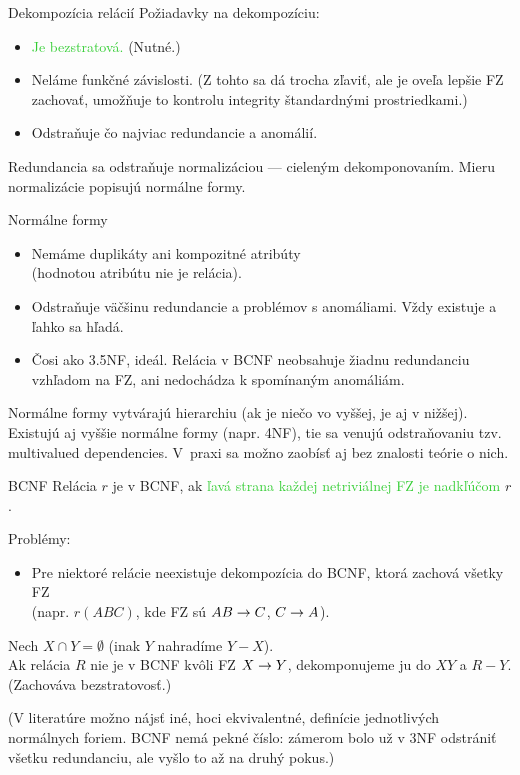 \documentclass[12pt]{beamer}
\def\blue#1{\textcolor{Cerulean}{#1}}
\def\green#1{\textcolor{LimeGreen}{#1}}
\begin{document}
\begin{frame}[fragile]{Dekompozícia relácií}
Požiadavky na dekompozíciu:
\begin{itemize}
\item \green{Je bezstratová.} (Nutné.)
\item \blue{Neláme funkčné závislosti.} (Z tohto sa dá trocha zľaviť,
            ale je oveľa lepšie FZ zachovať, umožňuje to kontrolu integrity štandardnými prostriedkami.)
\item \alert{Odstraňuje čo najviac redundancie a anomálií.}
\end{itemize}
Redundancia sa odstraňuje \alert{normalizáciou} --- cieleným dekomponovaním.
Mieru normalizácie popisujú \alert{normálne formy}.
\end{frame}

\begin{frame}[fragile]{Normálne formy}
\begin{itemize}
\item[\alert{1NF}] Nemáme duplikáty ani kompozitné atribúty\\ (hodnotou atribútu nie je relácia).
\item[\alert{3NF}] Odstraňuje väčšinu redundancie a problémov s anomáliami. Vždy existuje a ľahko sa hľadá.
\item[\alert{BCNF}] Čosi ako 3.5NF, ideál. Relácia v BCNF neobsahuje žiadnu redundanciu vzhľadom na FZ, ani nedochádza k spomínaným anomáliám.
\end{itemize}
Normálne formy vytvárajú hierarchiu (ak je niečo vo vyššej, je aj v nižšej).
Existujú aj vyššie normálne formy (napr. 4NF), tie sa venujú odstraňovaniu tzv. multivalued dependencies.
V~praxi sa možno zaobísť aj bez znalosti teórie o nich.
\end{frame}

\begin{frame}[fragile]{BCNF}
Relácia $r$ je v BCNF, ak \green{ľavá strana každej netriviálnej FZ je nadkľúčom} $r$.

\bigskip
Problémy:
\begin{itemize}
\item Pre niektoré relácie neexistuje dekompozícia do BCNF, ktorá zachová všetky FZ\\ (napr. $r(ABC)$, kde FZ sú $AB\rightarrow C$, $C\rightarrow A$).
\end{itemize}

\bigskip
Nech $X\cap Y=\emptyset$ (inak $Y$ nahradíme $Y-X$).\\
Ak relácia $R$ nie je v BCNF kvôli FZ $X\rightarrow Y$, dekomponujeme ju do $XY$ a $R-Y$.
(Zachováva bezstratovosť.)

(V literatúre možno nájsť iné, hoci ekvivalentné, definície jednotlivých normálnych foriem.
BCNF nemá pekné číslo: zámerom bolo už v 3NF odstrániť všetku redundanciu,
ale vyšlo to až na druhý pokus.)
\end{frame}
\end{document}
